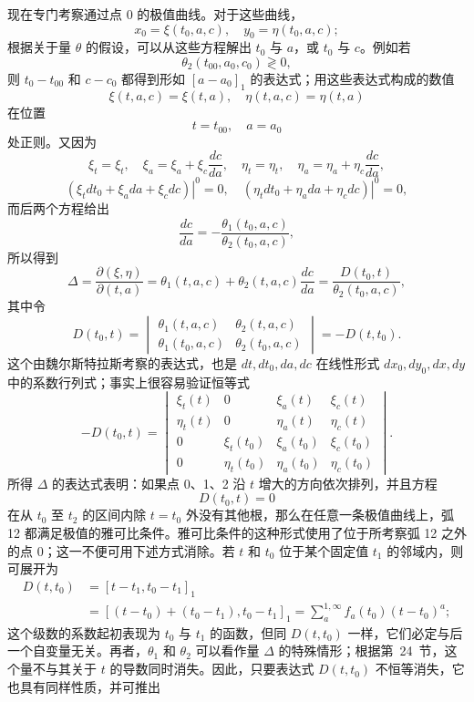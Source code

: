 \documentclass[11pt,a4paper,leqno]{article}
\begin{document}
现在专门考察通过点 0 的极值曲线。对于这些曲线，
\[
x_0=\xi(t_0,a,c),
\quad
y_0=\eta(t_0,a,c);
\]
根据关于量 $\theta$ 的假设，可以从这些方程解出 $t_0$ 与 $a$，或 $t_0$ 与 $c$。例如若
\[
\theta_2(t_{00},a_0,c_0)\gtrless0,
\]
则 $t_0-t_{00}$ 和 $c-c_0$ 都得到形如 $[a-a_0]_1$ 的表达式；用这些表达式构成的数值
\[
\xi(t,a,c)=\xi(t,a),
\quad
\eta(t,a,c)=\eta(t,a)
\]
在位置
\[
t=t_{00},
\quad
a=a_0
\]
处正则。又因为
\[
\xi_t=\xi_t,
\quad
\xi_a=\xi_a+\xi_c\frac{dc}{da},
\quad
\eta_t=\eta_t,
\quad
\eta_a=\eta_a+\eta_c\frac{dc}{da},
\]
\[
\left.(\xi_tdt_0+\xi_ada+\xi_cdc)\right|^0=0,
\quad
\left.(\eta_tdt_0+\eta_ada+\eta_cdc)\right|^0=0,
\]
而后两个方程给出
\[
\frac{dc}{da}=-\frac{\theta_1(t_0,a,c)}{\theta_2(t_0,a,c)},
\]
所以得到
\[
\Delta=\frac{\partial(\xi,\eta)}{\partial(t,a)}
=\theta_1(t,a,c)+\theta_2(t,a,c)\frac{dc}{da}
=\frac{D(t_0,t)}{\theta_2(t_0,a,c)},
\]
其中令
\[
D(t_0,t)=
\begin{vmatrix}
\theta_1(t,a,c)&\theta_2(t,a,c)\\
\theta_1(t_0,a,c)&\theta_2(t_0,a,c)
\end{vmatrix}
=-D(t,t_0).
\]
这个由魏尔斯特拉斯考察的表达式，也是 $dt,dt_0,da,dc$ 在线性形式 $dx_0,dy_0,dx,dy$ 中的系数行列式；事实上很容易验证恒等式
\[
-D(t_0,t)=
\begin{vmatrix}
\xi_t(t)&0&\xi_a(t)&\xi_c(t)\\
\eta_t(t)&0&\eta_a(t)&\eta_c(t)\\
0&\xi_t(t_0)&\xi_a(t_0)&\xi_c(t_0)\\
0&\eta_t(t_0)&\eta_a(t_0)&\eta_c(t_0)
\end{vmatrix}.
\]
所得 $\Delta$ 的表达式表明：如果点 0、1、2 沿 $t$ 增大的方向依次排列，并且方程
\[
D(t_0,t)=0
\]
在从 $t_0$ 至 $t_2$ 的区间内除 $t=t_0$ 外没有其他根，那么在任意一条极值曲线上，弧 12 都满足极值的雅可比条件。雅可比条件的这种形式使用了位于所考察弧 12 之外的点 0；这一不便可用下述方式消除。若 $t$ 和 $t_0$ 位于某个固定值 $t_1$ 的邻域内，则可展开为
\begin{equation}\tag{103}
\begin{aligned}
D(t,t_0)&=[t-t_1,t_0-t_1]_1\\
&=[(t-t_0)+(t_0-t_1),t_0-t_1]_1
=\sum_a^{1,\infty}f_a(t_0)(t-t_0)^a;
\end{aligned}
\end{equation}
这个级数的系数起初表现为 $t_0$ 与 $t_1$ 的函数，但同 $D(t,t_0)$ 一样，它们必定与后一个自变量无关。再者，$\theta_1$ 和 $\theta_2$ 可以看作量 $\Delta$ 的特殊情形；根据第~24~节，这个量不与其关于 $t$ 的导数同时消失。因此，只要表达式 $D(t,t_0)$ 不恒等消失，它也具有同样性质，并可推出
\end{document}
